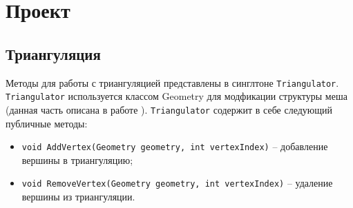 \documentclass{fefu}
\begin{document}
\section{Проект}
\subsection{Триангуляция}
Методы для работы с триангуляцией представлены в синглтоне \texttt{Triangulator}. \texttt{Triangulator} используется 
классом Geometry для модфикации структуры меша (данная часть описана в работе \cite{Gomenyuk}). \texttt{Triangulator} 
содержит в себе следующий публичные методы:
\begin{itemize}
    \item \texttt{void AddVertex(Geometry geometry, int vertexIndex)} -- добавление вершины в триангуляцию;
    \item \texttt{void RemoveVertex(Geometry geometry, int vertexIndex)} -- удаление вершины из триангуляции.
\end{itemize}
\end{document}
